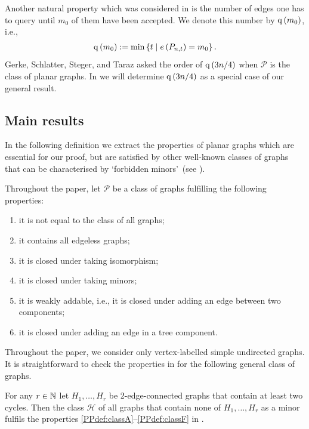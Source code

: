 Another natural property which was considered in \cite{GerkeSchlatterStegerTaraz2008} is the number of edges one has to query until $m_0$ of them have been accepted. We denote this number by $\operatorname{q}\left(m_0\right)$, i.e.,
\begin{align}\label{PPeq:10}
	\operatorname{q}\left(m_0\right):=\min\left\{t \mid e\left({P_{n,t}}\right)=m_0\right\}.
\end{align}
Gerke, Schlatter, Steger, and Taraz \cite{GerkeSchlatterStegerTaraz2008} asked the order of $\operatorname{q}\left(3n/4\right)$ when $\mathcal{P}$ is the class of planar graphs. In  we will determine $\operatorname{q}\left(3n/4\right)$ as a special case of our general result.

\subsection{Main results}\label{PPsubsec:main}
In the following definition we extract the properties of planar graphs which are essential for our proof, but are satisfied by other well-known classes of graphs that can be characterised by \lq forbidden minors\rq\ (see ). 

\begin{definition}\label{PPdef:class}
Throughout the paper, let $\mathcal{P}$ be a class of graphs fulfilling the following properties:
\begin{enumerate}
\item\label{PPdef:classA}
it is not equal to the class of all graphs;
\item\label{PPdef:classB}
it contains all edgeless graphs;
\item\label{PPdef:classC}
it is closed under taking isomorphism;
\item\label{PPdef:classD}
it is closed under taking minors;
\item\label{PPdef:classE}
it is weakly addable, i.e., it is closed under adding an edge between two components;
\item\label{PPdef:classF}
it is closed under adding an edge in a tree component.
\end{enumerate}
\end{definition}

Throughout the paper, we consider only vertex-labelled simple undirected graphs. It is straightforward to check the properties in  for the following general class of graphs.
\begin{prop}\label{PPprop:graph_classes}
For any $r\in\mathbb{N}$ let $H_1, \ldots, H_r$ be 2-edge-connected graphs that contain at least two cycles. Then the class $\mathcal{H}$ of all graphs that contain none of $H_1, \ldots, H_r$ as a minor fulfils the properties \ref{PPdef:classA}--\ref{PPdef:classF} in .
\end{prop}


